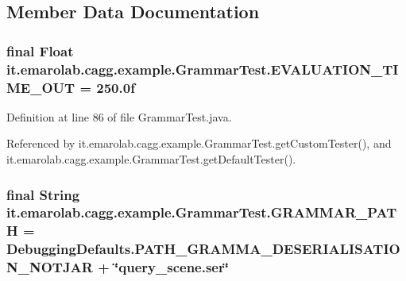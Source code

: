 \subsection{Member Data Documentation}
\hypertarget{classit_1_1emarolab_1_1cagg_1_1example_1_1GrammarTest_a700ef05420c3f7fef7bd7c0bfe80aa2d}{
\subsubsection[{E\-V\-A\-L\-U\-A\-T\-I\-O\-N\-\_\-\-T\-I\-M\-E\-\_\-\-O\-U\-T}]{\setlength{\rightskip}{0pt plus 5cm}final Float it.\-emarolab.\-cagg.\-example.\-Grammar\-Test.\-E\-V\-A\-L\-U\-A\-T\-I\-O\-N\-\_\-\-T\-I\-M\-E\-\_\-\-O\-U\-T = 250.\-0f\hspace{0.3cm}{\ttfamily [static]}}}\label{classit_1_1emarolab_1_1cagg_1_1example_1_1GrammarTest_a700ef05420c3f7fef7bd7c0bfe80aa2d}


Definition at line 86 of file Grammar\-Test.\-java.



Referenced by it.\-emarolab.\-cagg.\-example.\-Grammar\-Test.\-get\-Custom\-Tester(), and it.\-emarolab.\-cagg.\-example.\-Grammar\-Test.\-get\-Default\-Tester().

\hypertarget{classit_1_1emarolab_1_1cagg_1_1example_1_1GrammarTest_a6b2621e3a1e229630bab2da06bd0acf6}{
\subsubsection[{G\-R\-A\-M\-M\-A\-R\-\_\-\-P\-A\-T\-H}]{\setlength{\rightskip}{0pt plus 5cm}final String it.\-emarolab.\-cagg.\-example.\-Grammar\-Test.\-G\-R\-A\-M\-M\-A\-R\-\_\-\-P\-A\-T\-H = {\bf Debugging\-Defaults.\-P\-A\-T\-H\-\_\-\-G\-R\-A\-M\-M\-A\-\_\-\-D\-E\-S\-E\-R\-I\-A\-L\-I\-S\-A\-T\-I\-O\-N\-\_\-\-N\-O\-T\-J\-A\-R} + \char`\"{}query\-\_\-scene.\-ser\char`\"{}\hspace{0.3cm}{\ttfamily [static]}}}\label{classit_1_1emarolab_1_1cagg_1_1example_1_1GrammarTest_a6b2621e3a1e229630bab2da06bd0acf6}


